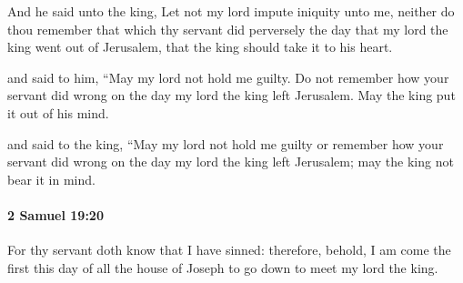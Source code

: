 			\begin{versebox}
					\item[BHS] 
					\item[ASV] And he said unto the king, Let not my lord impute iniquity unto me, neither do thou remember that which thy servant did perversely the day that my lord the king went out of Jerusalem, that the king should take it to his heart.
					\item[NIV] and said to him, “May my lord not hold me guilty. Do not remember how your servant did wrong on the day my lord the king left Jerusalem. May the king put it out of his mind.
					\item[NRSV] and said to the king, “May my lord not hold me guilty or remember how your servant did wrong on the day my lord the king left Jerusalem; may the king not bear it in mind.
			\end{versebox}

		\paragraph{2 Samuel 19:20} %
			\label{2SAMUEL-19-20}

			For thy servant doth know that I have sinned: therefore, behold, I am come the first this day of all the house of Joseph to go down to meet my lord the king.

